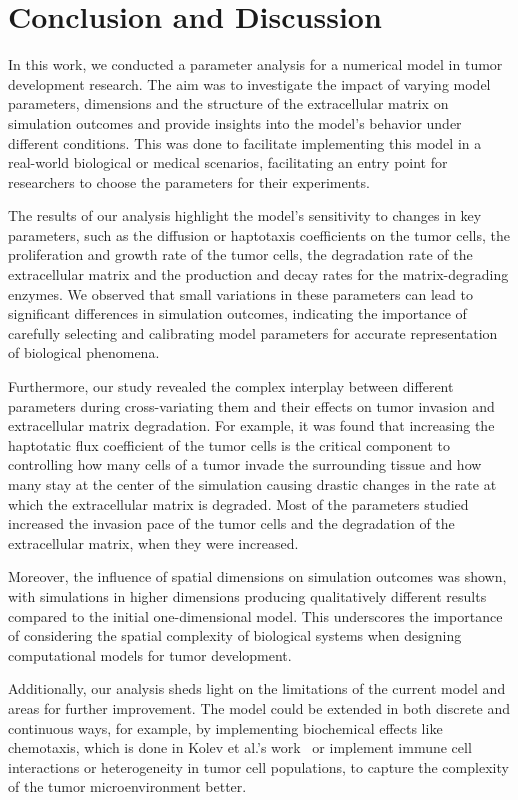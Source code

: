 \section{Conclusion and Discussion}
In this work, we conducted a parameter analysis for a numerical model in tumor development research. The aim was to investigate the impact of varying model parameters, dimensions and the structure of the extracellular matrix on simulation outcomes and provide insights into the model's behavior under different conditions. This was done to facilitate implementing this model in a real-world biological or medical scenarios, facilitating an entry point for researchers to choose the parameters for their experiments.

The results of our analysis highlight the model's sensitivity to changes in key parameters, such as the diffusion or haptotaxis coefficients on the tumor cells, the proliferation and growth rate of the tumor cells, the degradation rate of the extracellular matrix and the production and decay rates for the matrix-degrading enzymes. We observed that small variations in these parameters can lead to significant differences in simulation outcomes, indicating the importance of carefully selecting and calibrating model parameters for accurate representation of biological phenomena.

Furthermore, our study revealed the complex interplay between different parameters during cross-variating them and their effects on tumor invasion and extracellular matrix degradation. For example, it was found that increasing the haptotatic flux coefficient of the tumor cells is the critical component to controlling how many cells of a tumor invade the surrounding tissue and how many stay at the center of the simulation causing drastic changes in the rate at which the extracellular matrix is degraded. Most of the parameters studied increased the invasion pace of the tumor cells and the degradation of the extracellular matrix, when they were increased.

Moreover, the influence of spatial dimensions on simulation outcomes was shown, with simulations in higher dimensions producing qualitatively different results compared to the initial one-dimensional model. This underscores the importance of considering the spatial complexity of biological systems when designing computational models for tumor development.

Additionally, our analysis sheds light on the limitations of the current model and areas for further improvement. The model could be extended in both discrete and continuous ways, for example, by implementing biochemical effects like chemotaxis, which is done in Kolev et al.'s work~\cite{Kolev2010} or implement immune cell interactions or heterogeneity in tumor cell populations, to capture the complexity of the tumor microenvironment better.

